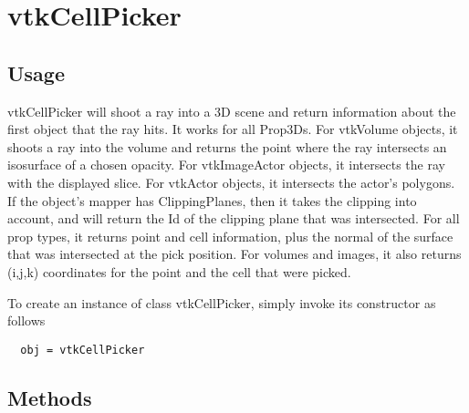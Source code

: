 \section{vtkCellPicker}

\subsection{Usage}

 vtkCellPicker will shoot a ray into a 3D scene and return information
 about the first object that the ray hits.  It works for all Prop3Ds.
 For vtkVolume objects, it shoots a ray into the volume and returns
 the point where the ray intersects an isosurface of a chosen opacity.
 For vtkImageActor objects, it intersects the ray with the displayed
 slice. For vtkActor objects, it intersects the actor's polygons.
 If the object's mapper has ClippingPlanes, then it takes the clipping
 into account, and will return the Id of the clipping plane that was
 intersected.
 For all prop types, it returns point and cell information, plus the
 normal of the surface that was intersected at the pick position.  For
 volumes and images, it also returns (i,j,k) coordinates for the point
 and the cell that were picked.  


To create an instance of class vtkCellPicker, simply
invoke its constructor as follows
\begin{verbatim}
  obj = vtkCellPicker
\end{verbatim}
\subsection{Methods}

